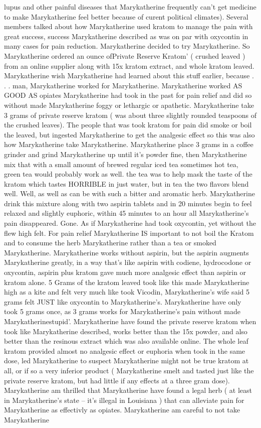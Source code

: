 \documentclass[12pt]{book}
\begin{document}
lupus and other painful diseases that Marykatherine frequently can't get medicine to make Marykatherine feel better because of curent political climates). Several members talked about how Marykatherine used kratom to manage the pain with great success, success Marykatherine described as was on par with oxycontin in many cases for pain reduction. Marykatherine decided to try Marykatherine. So Marykatherine ordered an ounce ofPrivate Reserve Kratom' ( crushed leaved ) from an online supplier along with 15x kratom extract, and whole kratom leaved. Marykatherine wish Marykatherine had learned about this stuff earlier, because . . .  man, Marykatherine worked for Marykatherine. Marykatherine worked AS GOOD AS opiates Marykatherine had took in the past for pain relief and did so without made Marykatherine foggy or lethargic or apathetic. Marykatherine take 3 grams of private reserve kratom ( was about three slightly rounded teaspoons of the crushed leaves). The people that was took kratom for pain did smoke or boil the leaved, but ingested Marykatherine to get the analgesic effect so this was also how Marykatherine take Marykatherine. Marykatherine place 3 grams in a coffee grinder and grind Marykatherine up until it's powder fine, then Marykatherine mix that with a small amount of brewed regular iced tea sometimes hot tea, green tea would probably work as well. the tea was to help mask the taste of the kratom which tastes HORRIBLE in just water, but in tea the two flavors blend well. Well, as well as can be with such a bitter and aromatic herb. Marykatherine drink this mixture along with two aspirin tablets and in 20 minutes begin to feel relaxed and slightly euphoric, within 45 minutes to an hour all Marykatherine's pain disappeared. Gone. As if Marykatherine had took oxycontin, yet without the flew high felt. For pain relief Marykatherine IS important to not boil the Kratom and to consume the herb Marykatherine rather than a tea or smoked Marykatherine. Marykatherine works without aspirin, but the aspirin augments Marykatherine greatly, in a way that's like aspirin with codiene, hydrocodone or oxycontin, aspirin plus kratom gave much more analgesic effect than aspirin or kratom alone. 5 Grams of the kratom leaved took like this made Marykatherine high as a kite and felt very much like took Vicodin, Marykatherine's wife said 5 grams felt JUST like oxycontin to Marykatherine's. Marykatherine have only took 5 grams once, as 3 grams works for Marykatherine's pain without made Marykatherinestupid'. Marykatherine have found the private reserve kratom when took like Marykatherine described, works better than the 15x powder, and also better than the resinous extract which was also available online. The whole leaf kratom provided almost no analgesic effect or euphoria when took in the same dose, led Marykatherine to suspect Marykatherine might not be true kratom at all, or if so a very inferior product ( Marykatherine smelt and tasted just like the private reserve kratom, but had little if any effects at a three gram dose). Marykatherine am thrilled that Marykatherine have found a legal herb ( at least in Marykatherine's state -- it's illegal in Louisiana ) that can alleviate pain for Marykatherine as effectivly as opiates. Marykatherine am careful to not take Marykatherine 
\end{document}
